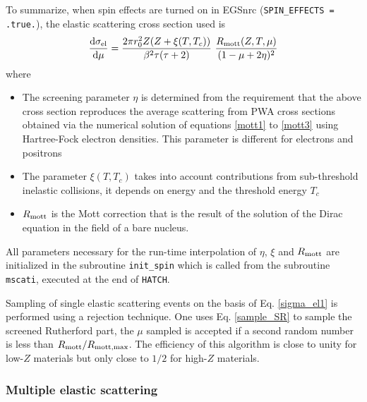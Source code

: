 To summarize, when spin effects are turned on in EGSnrc 
({\tt SPIN\_EFFECTS = .true.}), the elastic scattering 
cross section used is 
\begin{equation}
\label{sigma_el1}
{{\rm d}\sigma_{\rm el} \over {\rm d}\mu} = 
{2 \pi r_0^2 Z (Z + \xi(T,T_c)) \over 
\beta^2 \tau (\tau + 2) }~{R_{\rm mott}(Z,T,\mu) \over (1 - \mu + 2 \eta)^2} 
\end{equation}
where
\begin{itemize}
\item
The screening parameter $\eta$ is determined from the requirement 
that the above cross section reproduces the average scattering 
from PWA cross sections obtained via the numerical solution of 
equations \eqref{mott1} to \eqref{mott3} using Hartree-Fock 
electron densities. This parameter is different for electrons 
and positrons
\item
The parameter $\xi(T,T_c)$ takes into account contributions 
from sub-threshold inelastic collisions, it depends on energy 
and the threshold energy $T_c$
\item
$R_{\rm mott}$ is the Mott correction that is the result of 
the solution of the Dirac equation in the field of a bare nucleus. 
\end{itemize}  
All parameters necessary for the run-time interpolation 
of $\eta$, $\xi$ and $R_{\rm mott}$ are initialized in 
the subroutine {\tt init\_spin} which is called from 
the subroutine {\tt mscati}, executed at the end of {\tt HATCH}.

Sampling of single elastic scattering events on the basis of 
Eq. \eqref{sigma_el1} is performed using a rejection technique. 
One uses Eq. \eqref{sample_SR} to sample the screened Rutherford 
part, the $\mu$ sampled is accepted if a second random number is 
less than $R_{\rm mott}/R_{\rm mott,max}$. The efficiency of 
this algorithm is close to unity for low-$Z$ materials but 
only close to $1/2$ for high-$Z$ materials.

\subsubsection{Multiple elastic scattering}
\label{sec_MS}
\setcounter{equation}{0}

